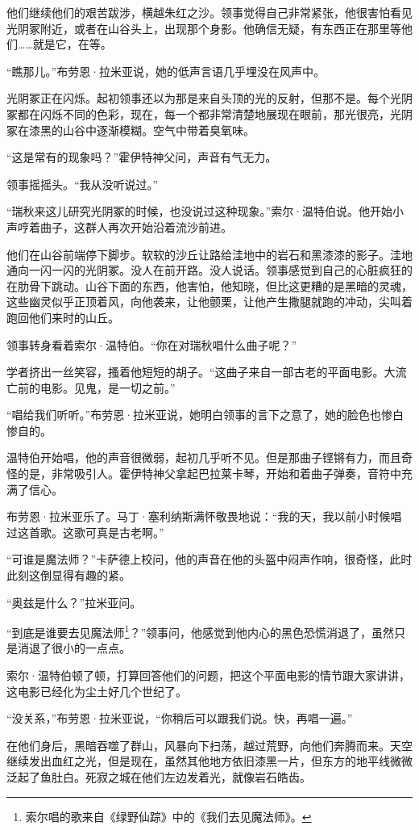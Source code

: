 \documentclass[AutoFakeBold=true]{book}
\begin{document}
他们继续他们的艰苦跋涉，横越朱红之沙。领事觉得自己非常紧张，他很害怕看见光阴冢附近，或者在山谷头上，出现那个身影。他确信无疑，有东西正在那里等他们……就是它，在等。

``瞧那儿。''布劳恩·拉米亚说，她的低声言语几乎埋没在风声中。

光阴冢正在闪烁。起初领事还以为那是来自头顶的光的反射，但那不是。每个光阴冢都在闪烁不同的色彩，现在，每一个都非常清楚地展现在眼前，那光很亮，光阴冢在漆黑的山谷中逐渐模糊。空气中带着臭氧味。

``这是常有的现象吗？''霍伊特神父问，声音有气无力。

领事摇摇头。``我从没听说过。''

``瑞秋来这儿研究光阴冢的时候，也没说过这种现象。''索尔·温特伯说。他开始小声哼着曲子，这群人再次开始沿着流沙前进。

他们在山谷前端停下脚步。软软的沙丘让路给洼地中的岩石和黑漆漆的影子。洼地通向一闪一闪的光阴冢。没人在前开路。没人说话。领事感觉到自己的心脏疯狂的在肋骨下跳动。山谷下面的东西，他害怕，他知晓，但比这更糟的是黑暗的灵魂，这些幽灵似乎正顶着风，向他袭来，让他颤栗，让他产生撒腿就跑的冲动，尖叫着跑回他们来时的山丘。

领事转身看着索尔·温特伯。``你在对瑞秋唱什么曲子呢？''

学者挤出一丝笑容，搔着他短短的胡子。``这曲子来自一部古老的平面电影。大流亡前的电影。见鬼，是一切之前。''

``唱给我们听听。''布劳恩·拉米亚说，她明白领事的言下之意了，她的脸色也惨白惨自的。

温特伯开始唱，他的声音很微弱，起初几乎听不见。但是那曲子铿锵有力，而且奇怪的是，非常吸引人。霍伊特神父拿起巴拉莱卡琴，开始和着曲子弹奏，音符中充满了信心。

布劳恩·拉米亚乐了。马丁·塞利纳斯满怀敬畏地说：``我的天，我以前小时候唱过这首歌。这歌可真是古老啊。''

``可谁是魔法师？''卡萨德上校问，他的声音在他的头盔中闷声作响，很奇怪，此时此刻这倒显得有趣的紧。

``奥兹是什么？''拉米亚问。

``到底是谁要去见魔法师\footnote{索尔唱的歌来自《绿野仙踪》中的《我们去见魔法师》。}？''领事问，他感觉到他内心的黑色恐慌消退了，虽然只是消退了很小的一点点。

索尔·温特伯顿了顿，打算回答他们的问题，把这个平面电影的情节跟大家讲讲，这电影已经化为尘土好几个世纪了。

``没关系，''布劳恩·拉米亚说，``你稍后可以跟我们说。快，再唱一遍。''

在他们身后，黑暗吞噬了群山，风暴向下扫荡，越过荒野，向他们奔腾而来。天空继续发出血红之光，但是现在，虽然其他地方依旧漆黑一片，但东方的地平线微微泛起了鱼肚白。死寂之城在他们左边发着光，就像岩石皓齿。
\end{document}
